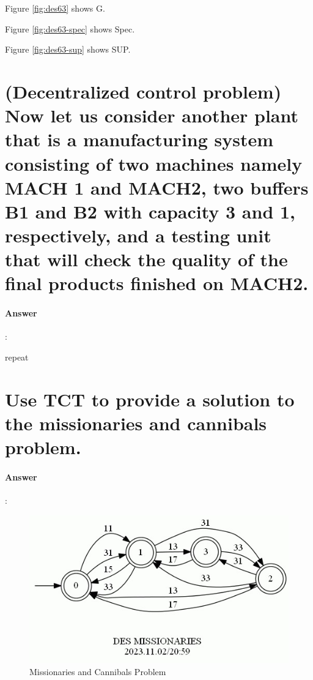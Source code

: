 \documentclass{article}
\begin{document}
Figure \ref{fig:des63} shows G.

Figure \ref{fig:des63-spec} shows Spec.

Figure \ref{fig:des63-sup} shows SUP.





\section{(Decentralized control problem) Now let us consider another plant that is a manufacturing system consisting of two machines namely MACH 1 and MACH2, two buffers B1 and B2 with capacity 3 and 1, respectively, and a testing unit that will check the quality of the final products finished on MACH2.}

\paragraph{Answer}:

repeat

\section{Use TCT to provide a solution to the missionaries and cannibals problem.}

\paragraph{Answer}:

\begin{figure}
  \centering
  \includegraphics{assets/MISSIONARIES.jpg}
  \caption{Missionaries and Cannibals Problem}
  \label{fig:des65}
\end{figure}
\end{document}
